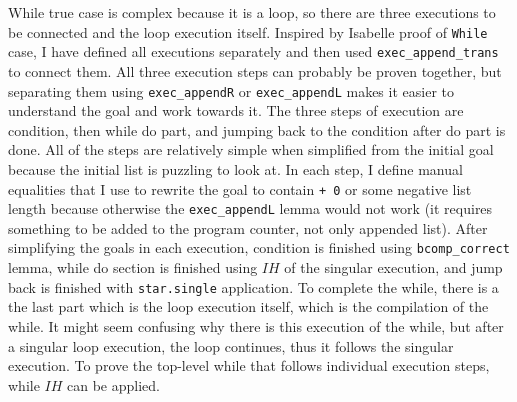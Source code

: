 While true case is complex because it is a loop, so there are three executions to be connected and the loop execution itself. Inspired by Isabelle proof of \lstinline{While} case, I have defined all executions separately and then used \lstinline{exec_append_trans} to connect them. All three execution steps can probably be proven together, but separating them using \lstinline{exec_appendR} or \lstinline{exec_appendL} makes it easier to understand the goal and work towards it. The three steps of execution are condition, then while do part, and jumping back to the condition after do part is done. All of the steps are relatively simple when simplified from the initial goal because the initial list is puzzling to look at. In each step, I define manual equalities that I use to rewrite the goal to contain \lstinline{+ 0} or some negative list length because otherwise the \lstinline{exec_appendL} lemma would not work (it requires something to be added to the program counter, not only appended list). After simplifying the goals in each execution, condition is finished using \lstinline{bcomp_correct} lemma, while do section is finished using $IH$ of the singular execution, and jump back is finished with \lstinline{star.single} application. To complete the while, there is a the last part which is the loop execution itself, which is the compilation of the while. It might seem confusing why there is this execution of the while, but after a singular loop execution, the loop continues, thus it follows the singular execution. To prove the top-level while that follows individual execution steps, while $IH$ can be applied.